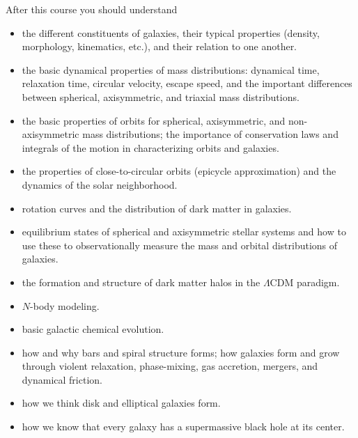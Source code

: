 \documentclass{article}
\begin{document}
After this course you should understand

\begin{itemize}

  \item the different constituents of galaxies, their typical
    properties (density, morphology, kinematics, etc.), and their
    relation to one another.

  \item the basic dynamical properties of mass distributions:
    dynamical time, relaxation time, circular velocity, escape speed,
    and the important differences between spherical, axisymmetric, and
    triaxial mass distributions.

  \item the basic properties of orbits for spherical, axisymmetric,
    and non-axisymmetric mass distributions; the importance of
    conservation laws and integrals of the motion in characterizing
    orbits and galaxies.

  \item the properties of close-to-circular orbits (epicycle
    approximation) and the dynamics of the solar neighborhood.

  \item rotation curves and the distribution of dark matter in
    galaxies.

  \item equilibrium states of spherical and axisymmetric stellar
    systems and how to use these to observationally measure the mass and
    orbital distributions of galaxies.

  \item the formation and structure of dark matter halos in the
    $\Lambda$CDM paradigm.

  \item $N$-body modeling.

  \item basic galactic chemical evolution.

  \item how and why bars and spiral structure forms; how galaxies form
    and grow through violent relaxation, phase-mixing, gas accretion,
    mergers, and dynamical friction.

  \item how we think disk and elliptical galaxies form.

  \item how we know that every galaxy has a supermassive black hole at
    its center.

\end{itemize}
\end{document}
